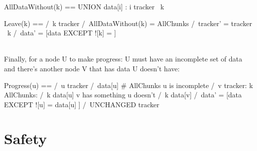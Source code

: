 \begin{tla}
AllDataWithout(k) == 
    UNION {data[i] : i \in tracker \ {k}}

Leave(k) == 
    /\ k \in tracker
    /\ AllDataWithout(k) = AllChunks
    /\ tracker' = tracker \ {k}
    /\ data' = [data EXCEPT ![k] = {}] 
\end{tla}
\begin{tlatex}
%
\@pvspace{8.0pt}%
%
%
%
\end{tlatex}
\\

Finally, for a node U to make progress: U must have an incomplete set of data and
there's another node V that has data U doesn't have:\\

\begin{tla}
Progress(u) == 
    /\ u \in tracker
    /\ data[u] # AllChunks  \* u is incomplete
    /\ \E v \in tracker:
        \E k \in AllChunks:
            /\ k \notin data[u]     \* v has something u doesn't
            /\ k \in data[v] 
            /\ data' = [data EXCEPT ![u] = data[u] ]
            /\ UNCHANGED tracker
\end{tla}
\begin{tlatex}
%
%
%
%
\@xx{}%
%
%
%
%
\@xx{}%
%
%
\end{tlatex}

\section{Safety}

